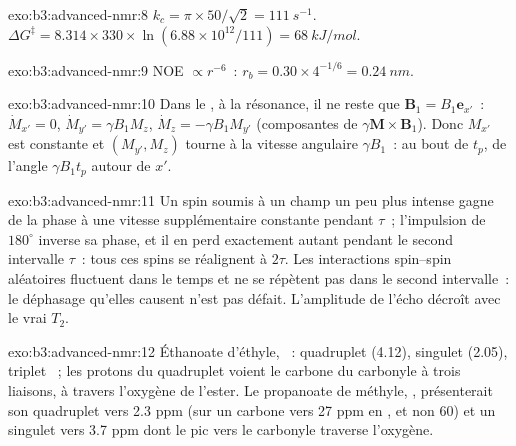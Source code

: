 \begin{solution}{exo:b3:advanced-nmr:8}
$k_c = \pi \times 50/\sqrt2 = \qty{111}{s^{-1}}$. $\Delta G^\ddagger = 8.314 \times 330 \times
\ln(6.88\times10^{12}/111) = \qty{68}{kJ/mol}$.
\end{solution}

\begin{solution}{exo:b3:advanced-nmr:9}
NOE $\propto r^{-6}$~: $r_b = 0.30 \times 4^{-1/6} = \qty{0.24}{nm}$.
\end{solution}

\begin{solution}{exo:b3:advanced-nmr:10}
Dans le , à la résonance, il ne reste que
$\mathbf B_1 = B_1\mathbf e_{x'}$~:
$\dot M_{x'} = 0$, $\dot M_{y'} = \gamma B_1M_z$, $\dot M_z = -\gamma B_1M_{y'}$ (composantes de
$\gamma\mathbf M\times\mathbf B_1$). Donc $M_{x'}$ est constante et
$(M_{y'}, M_z)$ tourne à la vitesse angulaire
$\gamma B_1$~: au bout de $t_p$, de l'angle $\gamma B_1t_p$ autour de $x'$.
\end{solution}

\begin{solution}{exo:b3:advanced-nmr:11}
Un spin soumis à un champ un peu plus intense gagne de la phase à une
vitesse supplémentaire constante pendant
$\tau$~; l'impulsion de $180^\circ$ inverse sa phase, et il en perd
exactement autant pendant le second intervalle $\tau$~: tous ces spins se
réalignent à $2\tau$. Les interactions spin--spin aléatoires fluctuent
dans le temps et ne se répètent pas dans le second intervalle~: le
déphasage qu'elles causent n'est pas défait. L'amplitude de l'écho
décroît avec le vrai $T_2$.
\end{solution}

\begin{solution}{exo:b3:advanced-nmr:12}
Éthanoate d'éthyle, ~: quadruplet  (4.12),
singulet  (2.05),
triplet ~; les protons du quadruplet voient le carbone du
carbonyle à trois liaisons, à travers l'oxygène de l'ester. Le propanoate
de méthyle, , présenterait son quadruplet vers 2.3 ppm
(sur un carbone vers 27 ppm en , et non 60) et un singulet
 vers 3.7 ppm dont le pic  vers le carbonyle traverse
l'oxygène.
\end{solution}

